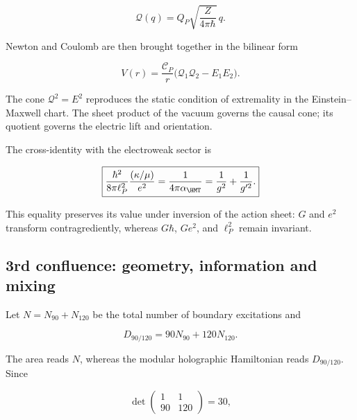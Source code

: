 \begin{equation}
 \mathcal Q(q)=Q_P\sqrt{\frac{Z}{4\pi\hbar}}\,q.
 \label{rm:eq:confluence-electric-coordinate}
\end{equation}

Newton and Coulomb are then brought together in the bilinear form

\begin{equation}
 \boxed{
 V(r)=\frac{\mathscr C_P}{r}
 \bigl(\mathcal Q_1\mathcal Q_2-E_1E_2\bigr).}
 \label{rm:eq:confluence-newton-coulomb}
\end{equation}

The cone \(\mathcal Q^2=E^2\) reproduces the static condition of
extremality in the Einstein--Maxwell chart.  The sheet product of the vacuum
governs the causal cone; its quotient governs the electric lift and
orientation.

The cross-identity with the electroweak sector is

\begin{equation}
 \boxed{
 \frac{\hbar^2}{8\pi\ell_P^2}
 \frac{(\kappa/\mu)}{e^2}
 =\frac1{4\pi\alpha_{\HMT}}
 =\frac1{g^2}+\frac1{g'^2}.}
 \label{rm:eq:confluence-einstein-maxwell-ew}
\end{equation}

This equality preserves its value under inversion of the action sheet:
\(G\) and \(e^2\) transform contragrediently, whereas
\(G\hbar\), \(Ge^2\), and \(\ell_P^2\) remain invariant.

\subsection{3rd confluence: geometry, information and mixing}

Let \(N=N_{90}+N_{120}\) be the total number of boundary excitations and

\begin{equation}
 D_{90/120}=90N_{90}+120N_{120}.
 \label{rm:eq:confluence-modular-provenance}
\end{equation}

The area reads \(N\), whereas the modular holographic Hamiltonian reads
\(D_{90/120}\). Since

\begin{equation}
 \det\begin{pmatrix}1&1\\90&120\end{pmatrix}=30,
 \label{rm:eq:confluence-modular-determinant}
\end{equation}

